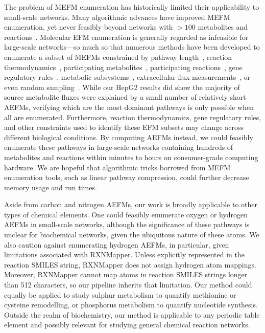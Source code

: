 \documentclass[12pt]{article}
\begin{document}
The problem of MEFM enumeration has historically limited their
applicability to small-scale networks. Many algorithmic advances have
improved MEFM enumeration, yet never feasibly beyond networks
with $>100$ metabolites and
reactions~\citep{KampAxelvon2006M5fa,TerzerMarco2008Lcoe,vanKlinkenJanBert2016Faet}.
Molecular EFM enumeration is generally regarded as infeasible for
large-scale networks---so much so that numerous methods have been
developed to enumerate a subset of MEFMs constrained by pathway
length~\citep{deFigueiredoLuisF2009Ctse}, reaction
thermodynamics~\citep{GerstlMatthiasP2015Mief}, participating
metabolites~\citep{PeyJon2014Dcoe}, participating
reactions~\citep{KaletaChristoph2009Ctwb}, gene regulatory
rules~\citep{JungreuthmayerChristian2013rSue}, metabolic
subsystems~\citep{SchusterS2002Etps,SchwartzJean-Marc2007Omfa},
extracellular flux
measurements~\citep{SoonsZitaITA2011Iomm,JungersRaphaelM.2011Fcom}, or
even random sampling~\citep{MachadoDaniel2012Rsoe}. While our HepG2
results did show the majority of source metabolite fluxes were explained
by a small number of relatively short AEFMs, verifying which are the most
dominant pathways is only possible when all are enumerated. Furthermore,
reaction thermodynamics, gene regulatory rules, and other constraints used
to identify these EFM subsets may change across different biological
conditions. By computing AEFMs instead, we could feasibly enumerate these
pathways in large-scale networks containing hundreds of metabolites and
reactions within minutes to hours on consumer-grade computing hardware. We
are hopeful that algorithmic tricks borrowed from MEFM enumeration tools,
such as linear pathway compression, could further decrease memory usage
and run times.

Aside from carbon and nitrogen AEFMs, our work is broadly applicable to
other types of chemical elements. One could feasibly enumerate oxygen or
hydrogen AEFMs in small-scale networks, although the significance of these
pathways is unclear for biochemical networks, given the ubiquitous nature
of these atoms. We also caution against enumerating hydrogen AEFMs, in
particular, given limitations associated with RXNMapper. Unless explicitly
represented in the reaction SMILES string, RXNMapper does not assign
hydrogen atom mappings. Moreover, RXNMapper cannot map atoms in reaction
SMILES strings longer than 512 characters, so our pipeline inherits that
limitation. Our method could equally be applied to study sulphur
metabolism to quantify methionine or cysteine remodelling, or phosphorus
metabolism to quantify nucleotide synthesis. Outside the realm of
biochemistry, our method is applicable to any periodic table element and
possibly relevant for studying general chemical reaction networks. 
\end{document}
